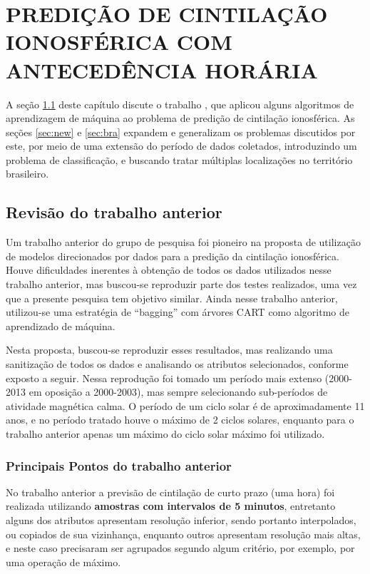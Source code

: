 \chapter{PREDIÇÃO DE CINTILAÇÃO IONOSFÉRICA COM ANTECEDÊNCIA HORÁRIA}\label{ch:revisonrezende}

A seção \ref{sec:revision} deste capítulo discute o trabalho \cite{REZENDE:2009, REZENDE:2010}, que aplicou alguns algoritmos de aprendizagem de máquina ao problema de predição de cintilação ionosférica. As seções \ref{sec:new} e \ref{sec:bra} expandem e generalizam os problemas discutidos por este, por meio de uma extensão do período de dados coletados, introduzindo um problema de classificação, e buscando tratar múltiplas localizações no território brasileiro.

\section{Revisão do trabalho anterior}\label{sec:revision}

Um trabalho anterior do grupo de pesquisa \cite{REZENDE:2009, REZENDE:2010} foi pioneiro na proposta de utilização de modelos direcionados por dados para a predição da cintilação ionosférica. Houve dificuldades inerentes à obtenção de todos os dados utilizados nesse trabalho anterior, mas buscou-se reproduzir parte dos testes realizados, uma vez que a presente pesquisa tem objetivo similar. Ainda nesse trabalho anterior, utilizou-se uma estratégia de ``bagging'' com árvores CART como algoritmo de aprendizado de máquina.

Nesta proposta, buscou-se reproduzir esses resultados, mas realizando uma sanitização de todos os dados e analisando os atributos selecionados, conforme exposto a seguir. Nessa reprodução foi tomado um período mais extenso (2000-2013 em oposição a 2000-2003), mas sempre selecionando sub-períodos de atividade magnética calma. O período de um ciclo solar é de aproximadamente 11 anos, e no período tratado houve o máximo de 2 ciclos solares, enquanto para o trabalho anterior apenas um máximo do ciclo solar máximo foi utilizado.

\subsection{Principais Pontos do trabalho anterior}

No trabalho anterior \cite{REZENDE:2009, REZENDE:2010} a previsão de cintilação de curto prazo (uma hora) foi realizada utilizando {\bf amostras com intervalos de 5 minutos}, entretanto alguns dos atributos apresentam resolução inferior, sendo portanto interpolados, ou copiados de sua vizinhança, enquanto outros apresentam resolução mais altas, e neste caso precisaram ser agrupados segundo algum critério, por exemplo, por uma operação de máximo.

